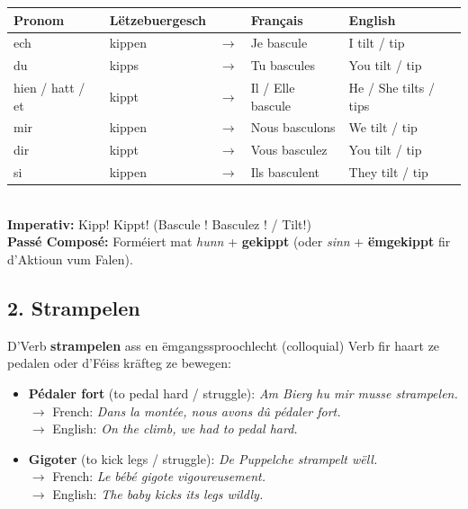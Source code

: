 \begin{tabular}{ll c l l}
    \toprule
    \textbf{Pronom} & \textbf{Lëtzebuergesch} & \textbf{} & \textbf{Français} & \textbf{English} \\
    \midrule
    ech & kippen & $\rightarrow$ & Je bascule & I tilt / tip \\
    du & kipps & $\rightarrow$ & Tu bascules & You tilt / tip \\
    hien / hatt / et & kippt & $\rightarrow$ & Il / Elle bascule & He / She tilts / tips \\
    \midrule
    mir & kippen & $\rightarrow$ & Nous basculons & We tilt / tip \\
    dir & kippt & $\rightarrow$ & Vous basculez & You tilt / tip \\
    si & kippen & $\rightarrow$ & Ils basculent & They tilt / tip \\
    \bottomrule
\end{tabular}
\\[0.5em]
\textbf{Imperativ:} Kipp! Kippt! (Bascule ! Basculez ! / Tilt!) \\
\textbf{Passé Composé:} Forméiert mat \textit{hunn} + \textbf{gekippt} (oder \textit{sinn} + \textbf{ëmgekippt} fir d'Aktioun vum Falen).

\subsection*{2. Strampelen}
D'Verb \textbf{strampelen} ass en ëmgangssproochlecht (colloquial) Verb fir haart ze pedalen oder d'Féiss kräfteg ze bewegen:
\begin{itemize}
    \item \textbf{Pédaler fort} (to pedal hard / struggle): \textit{Am Bierg hu mir musse strampelen.} \\
    $\rightarrow$ French: \textit{Dans la montée, nous avons dû pédaler fort.} \\
    $\rightarrow$ English: \textit{On the climb, we had to pedal hard.}
    
    \item \textbf{Gigoter} (to kick legs / struggle): \textit{De Puppelche strampelt wëll.} \\
    $\rightarrow$ French: \textit{Le bébé gigote vigoureusement.} \\
    $\rightarrow$ English: \textit{The baby kicks its legs wildly.}
\end{itemize}

